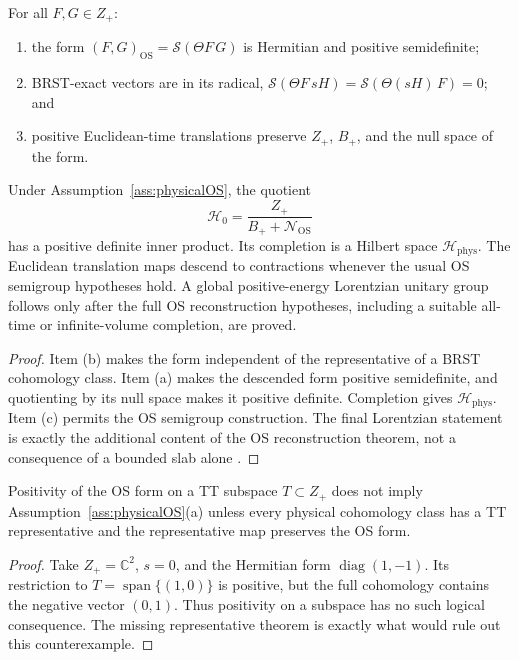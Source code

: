 \documentclass[11pt]{article}
\newcommand{\Hphys}{\mathcal H_{\mathrm{phys}}}
\begin{document}
\begin{assumption}\label{ass:physicalOS}
For all $F,G\in Z_+$:
\begin{enumerate}[label=\textup{(\alph*)}]
\item the form $(F,G)_{\mathrm{OS}}=\mathcal S(\Theta F\,G)$ is Hermitian and
positive semidefinite;
\item BRST-exact vectors are in its radical,
$\mathcal S(\Theta F\,sH)=\mathcal S(\Theta(sH)\,F)=0$; and
\item positive Euclidean-time translations preserve $Z_+$, $B_+$, and the null
space of the form.
\end{enumerate}
\end{assumption}

\begin{theorem}\label{thm:os}
Under Assumption~\ref{ass:physicalOS}, the quotient
\[
 \mathcal H_{0}=
 \frac{Z_+}{B_++\mathcal N_{\mathrm{OS}}}
\]
has a positive definite inner product.  Its completion is a Hilbert space
$\Hphys$.  The Euclidean translation maps descend to contractions whenever
the usual OS semigroup hypotheses hold.  A global positive-energy Lorentzian
unitary group follows only after the full OS reconstruction hypotheses,
including a suitable all-time or infinite-volume completion, are proved.
\end{theorem}

\begin{proof}
Item (b) makes the form independent of the representative of a BRST
cohomology class.  Item (a) makes the descended form positive semidefinite, and
quotienting by its null space makes it positive definite.  Completion gives
$\Hphys$.  Item (c) permits the OS semigroup construction.  The final
Lorentzian statement is exactly the additional content of the OS
reconstruction theorem, not a consequence of a bounded slab alone
\cite{OsterwalderSchrader1973,OsterwalderSchrader1975}.
\end{proof}

\begin{proposition}
Positivity of the OS form on a TT subspace $T\subset Z_+$ does not imply
Assumption~\ref{ass:physicalOS}(a) unless every physical cohomology class has a
TT representative and the representative map preserves the OS form.
\end{proposition}

\begin{proof}
Take $Z_+=\mathbb C^2$, $s=0$, and the Hermitian form
$\operatorname{diag}(1,-1)$.  Its restriction to
$T=\operatorname{span}\{(1,0)\}$ is positive, but the full cohomology contains
the negative vector $(0,1)$.  Thus positivity on a subspace has no such logical
consequence.  The missing representative theorem is exactly what would rule
out this counterexample.
\end{proof}
\end{document}
